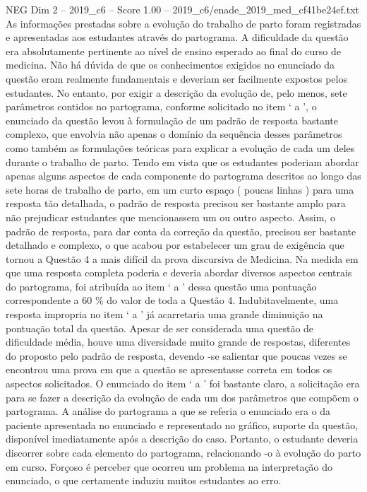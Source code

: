 \begin{textsample}{NEG Dim 2 – 2019\_c6 – Score 1.00 – 2019\_c6/enade\_2019\_med\_cf41be24ef.txt}
As informações prestadas sobre a evolução do trabalho de parto foram registradas e apresentadas aos estudantes através do partograma.
A dificuldade da questão era absolutamente pertinente ao nível de ensino esperado ao final do curso de medicina.
Não há dúvida de que os conhecimentos exigidos no enunciado da questão eram realmente fundamentais e deveriam ser facilmente expostos pelos estudantes.
No entanto, por exigir a descrição da evolução de, pelo menos, sete parâmetros contidos no partograma, conforme solicitado no item ‘ a ’, o enunciado da questão levou à formulação de um padrão de resposta bastante complexo, que envolvia não apenas o domínio da sequência desses parâmetros como também as formulações teóricas para explicar a evolução de cada um deles durante o trabalho de parto.
Tendo em vista que os estudantes poderiam abordar apenas alguns aspectos de cada componente do partograma descritos ao longo das sete horas de trabalho de parto, em um curto espaço ( poucas linhas ) para uma resposta tão detalhada, o padrão de resposta precisou ser bastante amplo para não prejudicar estudantes que mencionassem um ou outro aspecto.
Assim, o padrão de resposta, para dar conta da correção da questão, precisou ser bastante detalhado e complexo, o que acabou por estabelecer um grau de exigência que tornou a Questão 4 a mais difícil da prova discursiva de Medicina.
Na medida em que uma resposta completa poderia e deveria abordar diversos aspectos centrais do partograma, foi atribuída ao item ‘ a ’ dessa questão uma pontuação correspondente a 60 \% do valor de toda a Questão 4.
Indubitavelmente, uma resposta impropria no item ‘ a ’ já acarretaria uma grande diminuição na pontuação total da questão.
Apesar de ser considerada uma questão de dificuldade média, houve uma diversidade muito grande de respostas, diferentes do proposto pelo padrão de resposta, devendo -se salientar que poucas vezes se encontrou uma prova em que a questão se apresentasse correta em todos os aspectos solicitados.
O enunciado do item ‘ a ’ foi bastante claro, a solicitação era para se fazer a descrição da evolução de cada um dos parâmetros que compõem o partograma.
A análise do partograma a que se referia o enunciado era o da paciente apresentada no enunciado e representado no gráfico, suporte da questão, disponível imediatamente após a descrição do caso.
Portanto, o estudante deveria discorrer sobre cada elemento do partograma, relacionando -o à evolução do parto em curso.
Forçoso é perceber que ocorreu um problema na interpretação do enunciado, o que certamente induziu muitos estudantes ao erro.

\end{textsample}
